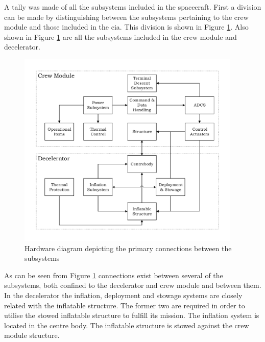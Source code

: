 A tally was made of all the subsystems included in the spacecraft. First a division can be made by distinguishing between the subsystems pertaining to the crew module and those included in the \gls{cia}. This division is shown in Figure \ref{fig:subsystems}. Also shown in Figure \ref{fig:subsystems} are all the subsystems included in the crew module and decelerator.
\begin{figure}[h]
	\includegraphics[width=0.95\textwidth]{./Figure/subsystem_breakdown/hardware_structure.pdf}
	\caption{Hardware diagram depicting the primary connections between the subsystems}
	\label{fig:subsystems} 
\end{figure}
%
%
%
%
%
%

As can be seen from Figure \ref{fig:subsystems} connections exist between several of the subsystems, both confined to the decelerator and crew module and between them. In the decelerator the inflation, deployment and stowage systems are closely related with the inflatable structure. The former two are required in order to utilise the stowed inflatable structure to fulfill its mission. The inflation system is located in the centre body. The inflatable structure is stowed against the crew module structure.

